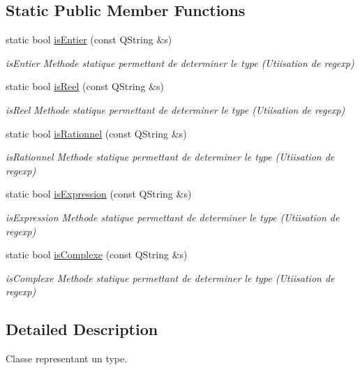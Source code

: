 \subsection*{Static Public Member Functions}
\begin{DoxyCompactItemize}
\item 
static bool \hyperlink{classtype_a011e2bd55a2d7784a1455bbc2fbba2e5}{is\-Entier} (const Q\-String \&s)
\begin{DoxyCompactList}\small\item\em is\-Entier Methode statique permettant de determiner le type (Utiisation de regexp) \end{DoxyCompactList}\item 
static bool \hyperlink{classtype_ae610cb80e031c43ae3c56033ec95a3a7}{is\-Reel} (const Q\-String \&s)
\begin{DoxyCompactList}\small\item\em is\-Reel Methode statique permettant de determiner le type (Utiisation de regexp) \end{DoxyCompactList}\item 
static bool \hyperlink{classtype_a8f2852f004b9d1676aa8ee4385d4ed49}{is\-Rationnel} (const Q\-String \&s)
\begin{DoxyCompactList}\small\item\em is\-Rationnel Methode statique permettant de determiner le type (Utiisation de regexp) \end{DoxyCompactList}\item 
static bool \hyperlink{classtype_a095a592d75acdef11c9e01e199c49e33}{is\-Expression} (const Q\-String \&s)
\begin{DoxyCompactList}\small\item\em is\-Expression Methode statique permettant de determiner le type (Utiisation de regexp) \end{DoxyCompactList}\item 
static bool \hyperlink{classtype_aeadbcfa313ab5a235bb44cf724c3ccba}{is\-Complexe} (const Q\-String \&s)
\begin{DoxyCompactList}\small\item\em is\-Complexe Methode statique permettant de determiner le type (Utiisation de regexp) \end{DoxyCompactList}\end{DoxyCompactItemize}


\subsection{Detailed Description}
Classe representant un type. 

